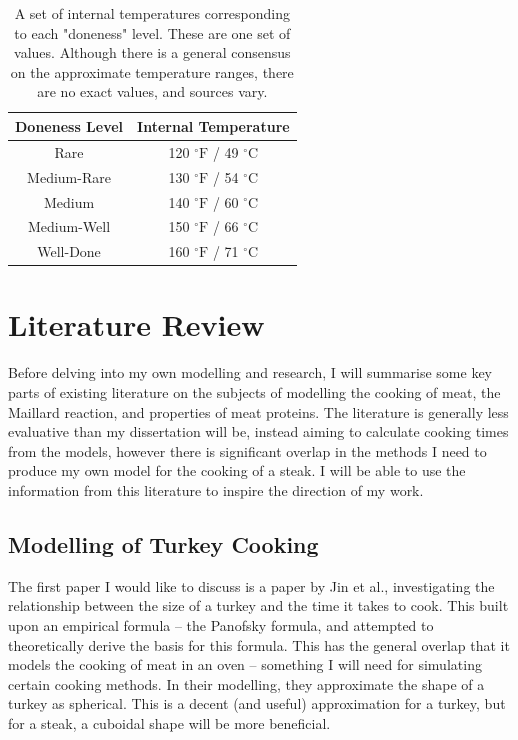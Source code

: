 \documentclass[11pt]{article}
\begin{document}
	\begin{table}[H]
		\centering
		\begin{tabular}{|c|c|}
			\hline
			Doneness Level & Internal Temperature \\
			\hline
			Rare & 120 $^\circ\text{F}$ / 49 $^\circ\text{C}$ \\
			Medium-Rare & 130 $^\circ\text{F}$ / 54 $^\circ\text{C}$ \\
			Medium & 140 $^\circ\text{F}$ / 60 $^\circ\text{C}$ \\
			Medium-Well & 150 $^\circ\text{F}$ / 66 $^\circ\text{C}$ \\
			Well-Done & 160 $^\circ\text{F}$ / 71 $^\circ\text{C}$ \\
			\hline
		\end{tabular}
		\caption{A set of internal temperatures corresponding to each "doneness" level. These are one set of values\cite{doneness}. Although there is a general consensus on the approximate temperature ranges, there are no exact values, and sources vary.}
		\label{tab:doneness}
	\end{table}
	
	\section{Literature Review}
	
	Before delving into my own modelling and research, I will summarise some key parts of existing literature on the subjects of modelling the cooking of meat, the Maillard reaction, and properties of meat proteins. The literature is generally less evaluative than my dissertation will be, instead aiming to calculate cooking times from the models, however there is significant overlap in the methods I need to produce my own model for the cooking of a steak. I will be able to use the information from this literature to inspire the direction of my work.
	
	\subsection*{Modelling of Turkey Cooking}
	
	The first paper I would like to discuss is a paper by Jin et al.\cite{turkey_2021}, investigating the relationship between the size of a turkey and the time it takes to cook. This built upon an empirical formula -- the Panofsky formula, and attempted to theoretically derive the basis for this formula. This has the general overlap that it models the cooking of meat in an oven -- something I will need for simulating certain cooking methods. In their modelling, they approximate the shape of a turkey as spherical. This is a decent (and useful) approximation for a turkey, but for a steak, a cuboidal shape will be more beneficial. \\
	
\end{document}
